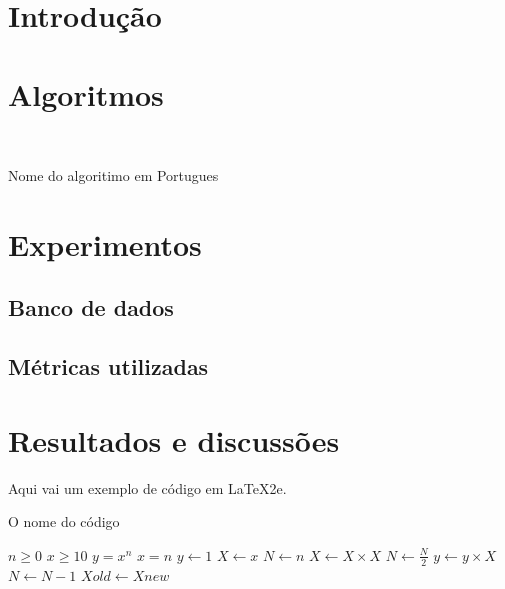 
\section{Introdução}

\lipsum[2-4]

\section{Algoritmos}

\begin{algorithm}[H]

    \
   \caption{Nome do algoritimo em Portugues}


\end{algorithm}

\section{Experimentos}

\lipsum[2-4]

\subsection{Banco de dados}

\lipsum[2-4]

\subsection{Métricas utilizadas}

\lipsum[2-4]

\section{Resultados e discussões}
\par Aqui vai um exemplo de código em \LaTeX2e.

\begin{algorithm} [H]
	\caption{O nome do código}\label{alg:cap}

	\begin{algorithmic} [H]
		\Require $n \geq 0$	
    \Require $x \geq 10$	
		\Ensure $y = x^n$   	
    \Ensure $x = n $      
		\State $y \gets 1$
		\State $X \gets x$
		\State $N \gets n$
			 	   \State $X \gets X \times X$
 			   	\State $N \gets \frac{N}{2}$  
			\ElsIf{$N = 0$ }
   				 \State $y \gets y \times X$
  			 	 \State $N \gets N - 1$
				\State $Xold \gets Xnew$
			\EndIf
		\EndWhile
	\end{algorithmic}

\end{algorithm}


